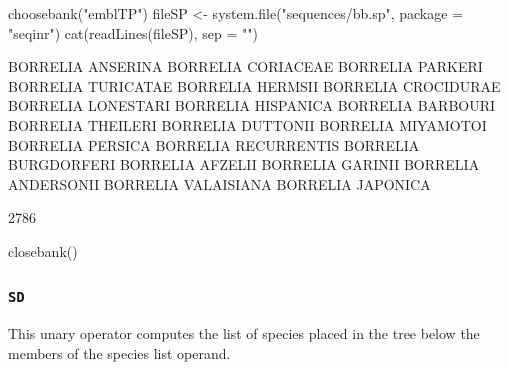 \documentclass{article}
\begin{document}
\begin{Schunk}
\begin{Sinput}
 choosebank("emblTP")
 fileSP <- system.file("sequences/bb.sp", package = "seqinr")
 cat(readLines(fileSP), sep = "\n")
\end{Sinput}
\begin{Soutput}
BORRELIA ANSERINA
BORRELIA CORIACEAE
BORRELIA PARKERI
BORRELIA TURICATAE
BORRELIA HERMSII
BORRELIA CROCIDURAE
BORRELIA LONESTARI
BORRELIA HISPANICA
BORRELIA BARBOURI
BORRELIA THEILERI
BORRELIA DUTTONII
BORRELIA MIYAMOTOI
BORRELIA PERSICA
BORRELIA RECURRENTIS
BORRELIA BURGDORFERI
BORRELIA AFZELII
BORRELIA GARINII
BORRELIA ANDERSONII
BORRELIA VALAISIANA
BORRELIA JAPONICA
\end{Soutput}
\begin{Soutput}
[1] 2786
\end{Soutput}
\begin{Sinput}
 closebank()
\end{Sinput}
\end{Schunk}

\subsubsection{\texttt{SD}}

This unary operator computes the list of species placed in the tree below the members of the 
species list operand.
\end{document}
